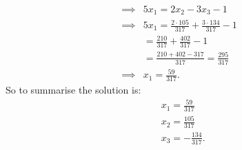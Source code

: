 \documentclass[10pt]{article}
\begin{document}
\begin{solution}[]
\begin{align*}
\implies & 5x_1 = 2x_2 - 3x_3 -1 \\
\implies & 5x_1 = \frac{2 \cdot105}{317} + \frac{3 \cdot134}{317} -1 \\
& = \frac{210}{317} + \frac{402}{317} - 1 \\
& = \frac{210 + 402 - 317}{317} = \frac{295}{317} \\
\implies & x_1 = \frac{59}{317}
.
\end{align*}
So to summarise the solution is:
\begin{align*}
 &  x_1 = \frac{59}{317} \\
 &  x_2 = \frac{105}{317} \\
 &  x_3 = - \frac{134}{317}
.
\end{align*}


\end{solution}
\end{document}
